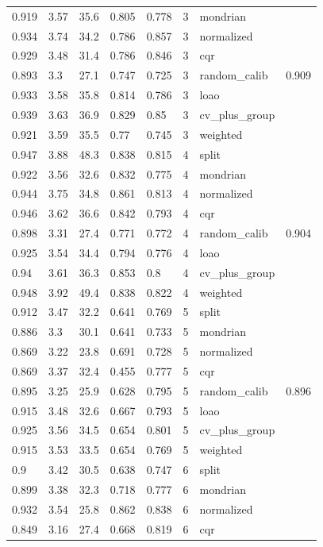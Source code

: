 \begin{tabular}{llllllll}
0.919 & 3.57 & 35.6 & 0.805 & 0.778 & 3 & mondrian &  \\
0.934 & 3.74 & 34.2 & 0.786 & 0.857 & 3 & normalized &  \\
0.929 & 3.48 & 31.4 & 0.786 & 0.846 & 3 & cqr &  \\
0.893 & 3.3 & 27.1 & 0.747 & 0.725 & 3 & random\_calib & 0.909 \\
0.933 & 3.58 & 35.8 & 0.814 & 0.786 & 3 & loao &  \\
0.939 & 3.63 & 36.9 & 0.829 & 0.85 & 3 & cv\_plus\_group &  \\
0.921 & 3.59 & 35.5 & 0.77 & 0.745 & 3 & weighted &  \\
0.947 & 3.88 & 48.3 & 0.838 & 0.815 & 4 & split &  \\
0.922 & 3.56 & 32.6 & 0.832 & 0.775 & 4 & mondrian &  \\
0.944 & 3.75 & 34.8 & 0.861 & 0.813 & 4 & normalized &  \\
0.946 & 3.62 & 36.6 & 0.842 & 0.793 & 4 & cqr &  \\
0.898 & 3.31 & 27.4 & 0.771 & 0.772 & 4 & random\_calib & 0.904 \\
0.925 & 3.54 & 34.4 & 0.794 & 0.776 & 4 & loao &  \\
0.94 & 3.61 & 36.3 & 0.853 & 0.8 & 4 & cv\_plus\_group &  \\
0.948 & 3.92 & 49.4 & 0.838 & 0.822 & 4 & weighted &  \\
0.912 & 3.47 & 32.2 & 0.641 & 0.769 & 5 & split &  \\
0.886 & 3.3 & 30.1 & 0.641 & 0.733 & 5 & mondrian &  \\
0.869 & 3.22 & 23.8 & 0.691 & 0.728 & 5 & normalized &  \\
0.869 & 3.37 & 32.4 & 0.455 & 0.777 & 5 & cqr &  \\
0.895 & 3.25 & 25.9 & 0.628 & 0.795 & 5 & random\_calib & 0.896 \\
0.915 & 3.48 & 32.6 & 0.667 & 0.793 & 5 & loao &  \\
0.925 & 3.56 & 34.5 & 0.654 & 0.801 & 5 & cv\_plus\_group &  \\
0.915 & 3.53 & 33.5 & 0.654 & 0.769 & 5 & weighted &  \\
0.9 & 3.42 & 30.5 & 0.638 & 0.747 & 6 & split &  \\
0.899 & 3.38 & 32.3 & 0.718 & 0.777 & 6 & mondrian &  \\
0.932 & 3.54 & 25.8 & 0.862 & 0.838 & 6 & normalized &  \\
0.849 & 3.16 & 27.4 & 0.668 & 0.819 & 6 & cqr &  \\

\end{tabular}
